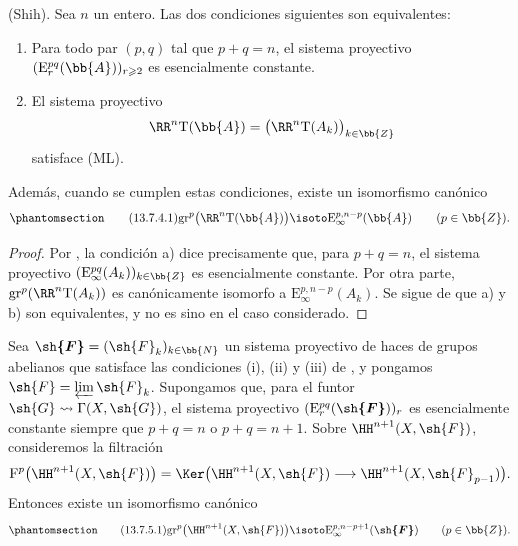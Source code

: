 \documentclass[oneside]{amsart}
\renewcommand{\geq}{\geqslant}
\let\EGAOriginalLabel\label
\renewcommand{\label}[1]{\phantomsection\EGAOriginalLabel{#1}}
\begin{document}
\begin{proposition}[13.7.4]
\label{0.13.7.4}
(Shih).
Sea $n$ un entero.
Las dos condiciones siguientes son equivalentes:
\begin{enumerate}
  \item[{\rm a)}] Para todo par $(p,q)$ tal que $p+q=n$, el
  sistema proyectivo
  $(\mathrm{E}_r^{pq}(\bb{A}))_{r\geq2}$ es esencialmente constante.
  \item[{\rm b)}] El sistema proyectivo
  \[
    \RR^n\mathrm{T}(\bb{A})
    =
    \bigl(\RR^n\mathrm{T}(A_k)\bigr)_{k\in\bb{Z}}
  \]
  satisface {\rm(ML)}.
\end{enumerate}
Además, cuando se cumplen estas condiciones, existe un
isomorfismo canónico
\begin{equation}
\label{0.13.7.4.1}
\tag{13.7.4.1}
  \mathrm{gr}^p\bigl(\RR^n\mathrm{T}(\bb{A})\bigr)
  \isoto
  \mathrm{E}_\infty^{p,n-p}(\bb{A})
  \qquad(p\in\bb{Z}).
\end{equation}
\end{proposition}

\begin{proof}
Por , la condición {\rm a)} dice precisamente que, para
$p+q=n$, el sistema proyectivo
$(\mathrm{E}_\infty^{pq}(A_k))_{k\in\bb{Z}}$ es esencialmente
constante.
Por otra parte,
$\mathrm{gr}^p(\RR^n\mathrm{T}(A_k))$ es canónicamente isomorfo a
$\mathrm{E}_\infty^{p,n-p}(A_k)$.
Se sigue de  que {\rm a)} y {\rm b)} son
equivalentes, y  no es sino
 en el caso considerado.
\end{proof}

\begin{corollary}[13.7.5]
\label{0.13.7.5}
Sea $\boldsymbol{\sh{F}}=(\sh{F}_k)_{k\in\bb{N}}$ un sistema proyectivo de
haces de grupos abelianos que satisface las condiciones {\rm(i)}, {\rm(ii)}
y {\rm(iii)} de , y pongamos
$\sh{F}=\varprojlim\sh{F}_k$.
Supongamos que, para el funtor
$\sh{G}\leadsto\Gamma(X,\sh{G})$, el sistema proyectivo
$(\mathrm{E}_r^{pq}(\boldsymbol{\sh{F}}))_r$ es esencialmente constante siempre que
$p+q=n$ o $p+q=n+1$.
Sobre $\HH^{n+1}(X,\sh{F})$, consideremos la filtración
\[
  \mathrm{F}^p\bigl(\HH^{n+1}(X,\sh{F})\bigr)
  =
  \Ker\bigl(
    \HH^{n+1}(X,\sh{F})
    \longrightarrow
    \HH^{n+1}(X,\sh{F}_{p-1})
  \bigr).
\]
Entonces existe un isomorfismo canónico
\begin{equation}
\label{0.13.7.5.1}
\tag{13.7.5.1}
  \mathrm{gr}^p\bigl(\HH^{n+1}(X,\sh{F})\bigr)
  \isoto
  \mathrm{E}_\infty^{p,n-p+1}(\boldsymbol{\sh{F}})
  \qquad(p\in\bb{Z}).
\end{equation}
\end{corollary}
\end{document}
